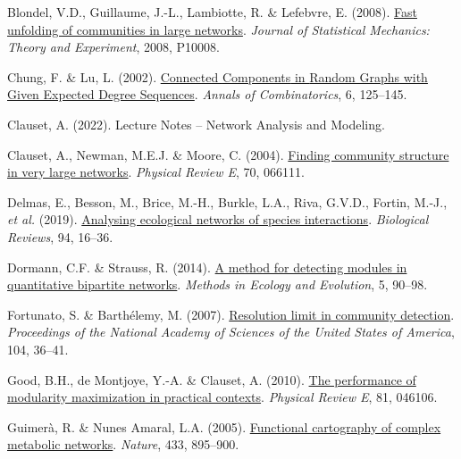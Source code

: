 \documentclass[
]{article}
\newlength{\cslhangindent}
\newlength{\cslentryspacingunit} %
\newenvironment{CSLReferences}[2] %
 {%
  \setlength{\parindent}{0pt}
  \ifodd #1
  \let\oldpar\par
  \def\par{\hangindent=\cslhangindent\oldpar}
  \fi
  \setlength{\parskip}{#2\cslentryspacingunit}
 }%
 {}
\begin{document}
\hypertarget{refs}{}
\begin{CSLReferences}{1}{0}
\leavevmode{}%
Blondel, V.D., Guillaume, J.-L., Lambiotte, R. \& Lefebvre, E. (2008).
\href{https://doi.org/10.1088/1742-5468/2008/10/P10008}{Fast unfolding
of communities in large networks}. \emph{Journal of Statistical
Mechanics: Theory and Experiment}, 2008, P10008.

\leavevmode{}%
Chung, F. \& Lu, L. (2002).
\href{https://doi.org/10.1007/PL00012580}{Connected {Components} in
{Random Graphs} with {Given Expected Degree Sequences}}. \emph{Annals of
Combinatorics}, 6, 125--145.

\leavevmode{}%
Clauset, A. (2022). Lecture {Notes} -- {Network Analysis} and
{Modeling}.

\leavevmode{}%
Clauset, A., Newman, M.E.J. \& Moore, C. (2004).
\href{https://doi.org/10.1103/PhysRevE.70.066111}{Finding community
structure in very large networks}. \emph{Physical Review E}, 70, 066111.

\leavevmode{}%
Delmas, E., Besson, M., Brice, M.-H., Burkle, L.A., Riva, G.V.D.,
Fortin, M.-J., \emph{et al.} (2019).
\href{https://doi.org/10.1111/brv.12433}{Analysing ecological networks
of species interactions}. \emph{Biological Reviews}, 94, 16--36.

\leavevmode{}%
Dormann, C.F. \& Strauss, R. (2014).
\href{https://doi.org/10.1111/2041-210X.12139}{A method for detecting
modules in quantitative bipartite networks}. \emph{Methods in Ecology
and Evolution}, 5, 90--98.

\leavevmode{}%
Fortunato, S. \& Barthélemy, M. (2007).
\href{https://doi.org/10.1073/pnas.0605965104}{Resolution limit in
community detection}. \emph{Proceedings of the National Academy of
Sciences of the United States of America}, 104, 36--41.

\leavevmode{}%
Good, B.H., de Montjoye, Y.-A. \& Clauset, A. (2010).
\href{https://doi.org/10.1103/PhysRevE.81.046106}{The performance of
modularity maximization in practical contexts}. \emph{Physical Review
E}, 81, 046106.

\leavevmode{}%
Guimerà, R. \& Nunes Amaral, L.A. (2005).
\href{https://doi.org/10.1038/nature03288}{Functional cartography of
complex metabolic networks}. \emph{Nature}, 433, 895--900.


\end{CSLReferences}
\end{document}
